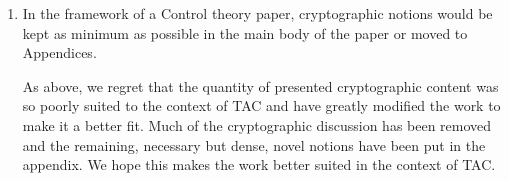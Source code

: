 \documentclass[a4paper]{scrartcl}
\newenvironment{rebuttal}{\begin{enumerate}[label={\color{grey}\thesection.\arabic{enumi}},leftmargin=0pt,ref=\thesection.\arabic{enumi}]}{\end{enumerate}}
\newcommand{\reviewtext}[1]{{\color{nblue} #1}}
\begin{document}
\begin{rebuttal}
We agree that the state of the initial submission was not as well suited to the TAC journal as could be desired and thank the reviewer for pointing this out. For the resubmission, we have greatly reduced the cryptographic components of the work and stated our contribution and its novelty more clearly to clarify the suitability of the proposed estimation method to the TAC journal. We will additionally consider some of the heavier cryptographic computations presented for an alternative submission elsewhere.

\item \reviewtext{In the framework of a Control theory paper, cryptographic notions would be kept as minimum as possible in the main body of the paper or moved to Appendices.}

As above, we regret that the quantity of presented cryptographic content was so poorly suited to the context of TAC and have greatly modified the work to make it a better fit. Much of the cryptographic discussion has been removed and the remaining, necessary but dense, novel notions have been put in the appendix. We hope this makes the work better suited in the context of TAC.

\end{rebuttal}

\end{document}
